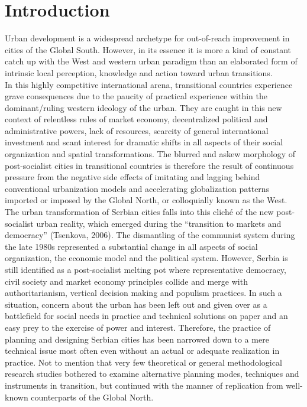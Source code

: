 \documentclass[11pt]{report}
\begin{document}

\chapter{Introduction}

Urban development is a widespread archetype for out-of-reach improvement in cities of the Global South. However, in its essence it is more a kind of constant catch up with the West and western urban paradigm than an elaborated form of intrinsic local perception, knowledge and action toward urban transitions.
\\
In this highly competitive international arena, transitional countries experience grave consequences due to the paucity of practical experience within the dominant/ruling western ideology of the urban. They are caught in this new context of relentless rules of market economy, decentralized political and administrative powers, lack of resources, scarcity of general international investment and scant interest for dramatic shifts in all aspects of their social organization and spatial transformations. The blurred and askew morphology of post-socialist cities in transitional countries is therefore the result of continuous pressure from the negative side effects of imitating and lagging behind conventional urbanization models and accelerating globalization patterns imported or imposed by the Global North, or colloquially known as the West.
\\
The urban transformation of Serbian cities falls into this cliché of the new post-socialist urban reality, which emerged during the “transition to markets and democracy” (Tsenkova, 2006). The dismantling of the communist system during the late 1980s represented a substantial change in all aspects of social organization, the economic model and the political system. However, Serbia is still identified as a post-socialist melting pot where representative democracy, civil society and market economy principles collide and merge with authoritarianism, vertical decision making and populism practices. In such a situation, concern about the urban has been left out and given over as a battlefield for social needs in practice and technical solutions on paper and an easy prey to the exercise of power and interest. Therefore, the practice of planning and designing Serbian cities has been narrowed down to a mere technical issue most often even without an actual or adequate realization in practice. Not to mention that very few theoretical or general methodological research studies bothered to examine alternative planning modes, techniques and instruments in transition, but continued with the manner of replication from well-known counterparts of the Global North.
\end{document}
